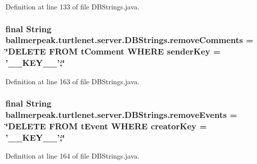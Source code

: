 Definition at line 133 of file D\-B\-Strings.\-java.

\hypertarget{classballmerpeak_1_1turtlenet_1_1server_1_1DBStrings_a54bb85c47ce1672a4adecc4104caa10e}{
\subsubsection[{remove\-Comments}]{\setlength{\rightskip}{0pt plus 5cm}final String ballmerpeak.\-turtlenet.\-server.\-D\-B\-Strings.\-remove\-Comments = \char`\"{}D\-E\-L\-E\-T\-E F\-R\-O\-M t\-Comment W\-H\-E\-R\-E sender\-Key = '\-\_\-\-\_\-\-K\-E\-Y\-\_\-\-\_\-';\char`\"{}\hspace{0.3cm}{\ttfamily [static]}}}\label{classballmerpeak_1_1turtlenet_1_1server_1_1DBStrings_a54bb85c47ce1672a4adecc4104caa10e}


Definition at line 163 of file D\-B\-Strings.\-java.

\hypertarget{classballmerpeak_1_1turtlenet_1_1server_1_1DBStrings_a107f35f84bfad780727aa44465cf9c59}{
\subsubsection[{remove\-Events}]{\setlength{\rightskip}{0pt plus 5cm}final String ballmerpeak.\-turtlenet.\-server.\-D\-B\-Strings.\-remove\-Events = \char`\"{}D\-E\-L\-E\-T\-E F\-R\-O\-M t\-Event W\-H\-E\-R\-E creator\-Key = '\-\_\-\-\_\-\-K\-E\-Y\-\_\-\-\_\-';\char`\"{}\hspace{0.3cm}{\ttfamily [static]}}}\label{classballmerpeak_1_1turtlenet_1_1server_1_1DBStrings_a107f35f84bfad780727aa44465cf9c59}


Definition at line 164 of file D\-B\-Strings.\-java.

